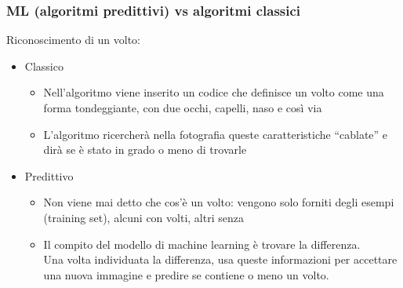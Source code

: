 \documentclass[../main.tex]{subfiles}
\begin{document}
	\subsubsection{ML (algoritmi predittivi) vs algoritmi classici}
	Riconoscimento di un volto: 
	\begin{itemize}
		\item Classico 
		\begin{itemize}
			\item Nell’algoritmo viene inserito un codice che definisce un volto come una forma tondeggiante, con due occhi, capelli, naso e così via
			\item L’algoritmo ricercherà nella fotografia queste caratteristiche “cablate” e dirà se è stato in grado o meno di trovarle 
		\end{itemize}
		\item Predittivo
		\begin{itemize}
			\item Non viene mai detto che cos’è un volto: vengono solo forniti degli esempi (training set), alcuni con volti, altri senza
			\item Il compito del modello di machine learning è trovare la differenza. \\
			Una volta individuata la differenza, usa queste informazioni per accettare una nuova immagine e predire se contiene o meno un volto.
		\end{itemize}
	\end{itemize}
\end{document}
